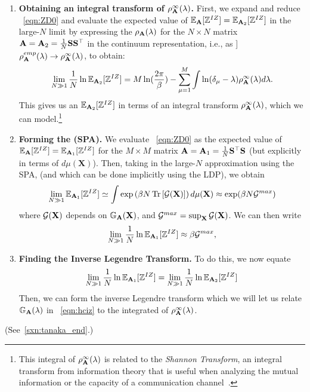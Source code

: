 \begin{enumerate}
   \item
   \textbf{Obtaining an integral transform of $\rho^{\infty}_{\mathbf{A}}(\lambda)$.}
   First, we expand and reduce \EQN~\ref{eqn:ZD0} and evaluate the expected value of
   $\mathbb{E}_{\mathbf{A}}[\mathbb{Z}^{IZ}]=\mathbb{E}_{\mathbf{A}_2}[\mathbb{Z}^{IZ}]$ in the large-$N$ limit by expressing the $\rho_{\mathbf{A}}(\lambda)$
   for the $N\times N$ matrix $\mathbf{A}=\mathbf{A}_{2}=\tfrac{1}{N}{\mathbf{S}}{\mathbf{S}}^{\top}$
   in the continuum representation, i.e., as ]
   $\rho^{emp}_{\mathbf{A}}(\lambda)\rightarrow \rho^{\infty}_{\mathbf{A}}(\lambda)$, to obtain:
   \begin{equation}
      \label{eqn:ZD_step1}
      \lim_{N\gg 1}\dfrac{1}{N}
      \ln\mathbb{E}_{\mathbf{A}_2}[\mathbb{Z}^{IZ}] =M\ln(\dfrac{2\pi}{\beta})-\sum_{\mu=1}^{M}\int \ln(\delta_{\mu}-\lambda)\rho^{\infty}_{\mathbf{A}}(\lambda)d\lambda  .
   \end{equation}
   This gives us an $\mathbb{E}_{\mathbf{A}_2}[\mathbb{Z}^{IZ}]$ in terms of an integral transform $\rho^{\infty}_{\mathbf{A}}(\lambda)$, which we can model.\footnote{This integral of $\rho^{\infty}_{\mathbf{A}}(\lambda)$  is related to the \emph{Shannon Transform}, an integral transform from information theory that is useful when analyzing the mutual information or the capacity of a communication channel~\cite{Tanaka2007}. }
   \item
   \textbf{Forming the \SaddlePointApproximation (SPA).}
   We evaluate \EQN~\ref{eqn:ZD0} as the expected value of $\mathbb{E}_{\mathbf{A}}[\mathbb{Z}^{IZ}]=\mathbb{E}_{\mathbf{A}_1}[\mathbb{Z}^{IZ}]$
   for the $M \times M$ matrix $\mathbf{A}=\mathbf{A}_{1}=\tfrac{1}{N}{\mathbf{S}}^{\top}{\mathbf{S}}$
   (but explicitly in terms of $d\mu(\mathbf{X})$).
   Then, taking in the large-$N$ approximation using the SPA,
    (and which can be done implicitly using the LDP), we obtain
   \begin{equation}  
  \label{eqn:ZD1} 
  \lim_{N \gg 1} \mathbb{E}_{\mathbf{A}_1}[\mathbb{Z}^{IZ}]\simeq\int  \exp\left(\beta N\mbox{}\operatorname{Tr}\left[\mathcal{G}(\mathbf{X})\right]\right)d\mu(\mathbf{X}) \approx \exp(\beta N\mathcal{G}^{max})
\end{equation}
  where  $\mathcal{G}(\mathbf{X})$ depends on $\mathbb{G}_{\mathbf{A}}(\mathbf{X})$, and $\mathcal{G}^{max}=\sup_{\mathbf{X}}\mathcal{G}(\mathbf{X})$.
  We can then write
   \begin{equation}
      \label{eqn:ZD_step2}
      \lim_{N \gg 1}\dfrac{1}{N}\ln\mathbb{E}_{\mathbf{A}_1}[\mathbb{Z}^{IZ}] \approx \beta\mathcal{G}^{max}  ,
   \end{equation}

 \item
 \textbf{Finding the Inverse Legendre Transform.}
  To do this, we now equate
  \begin{equation}
  \lim_{N \gg 1}\frac{1}{N}\ln\mathbb{E}_{\mathbf{A}_1}[\mathbb{Z}^{IZ}]=  \lim_{N \gg 1}\frac{1}{N}\ln\mathbb{E}_{\mathbf{A}_2}[\mathbb{Z}^{IZ}]
  \end{equation}
 Then, we can form the
 inverse Legendre transform  which we will let us relate $\mathbb{G}_{\mathbf{A}}(\lambda)$ in \EQN~\ref{eqn:hciz} to the integrated \RTransform of $\rho^{\infty}_{\mathbf{A}}(\lambda)$.
\end{enumerate}

\noindent

(See~\ref{sxn:tanaka_end}.)


